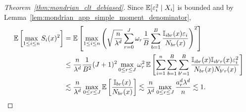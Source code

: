 \begin{proof}[Theorem~\ref{thm:mondrian_clt_debiased}]
  Since $\mathbb{E}[\varepsilon_i^2 \mid X_i]$ is bounded
  and by Lemma~\ref{lem:mondrian_app_simple_moment_denominator},
  \begin{align*}
    \mathbb{E}\left[\max_{1 \leq i \leq n} S_i(x)^2 \right]
    &=
    \mathbb{E}\left[
      \max_{1 \leq i \leq n}
      \left(
        \sqrt{\frac{n}{\lambda^d}}
        \sum_{r=0}^{J}
        \omega_r
        \frac{1}{B} \sum_{b=1}^B
        \frac{\mathbb{I}_{i b r}(x) \varepsilon_i} {N_{b r}(x)}
      \right)^2
    \right] \\
    &\leq
    \frac{n}{\lambda^d}
    \frac{1}{B^2}
    (J+1)^2
    \max_{0 \leq r \leq J}
    \omega_r^2
    \,\mathbb{E}\left[
      \sum_{i=1}^{n}
      \sum_{b=1}^B
      \sum_{b'=1}^B
      \frac{\mathbb{I}_{i b r}(x) \mathbb{I}_{i b' r}(x) \varepsilon_i^2}
      {N_{b r}(x) N_{b' r}(x)}
    \right] \\
    &\lesssim
    \frac{n}{\lambda^d}
    \max_{0 \leq r \leq J}
    \mathbb{E}\left[
      \frac{\mathbb{I}_{b r}(x)}{N_{b r}(x)}
    \right]
    \lesssim
    \frac{n}{\lambda^d}
    \max_{0 \leq r \leq J}
    \frac{a_r^d \lambda^d}{n}
    \lesssim 1.
  \end{align*}



\end{proof}
